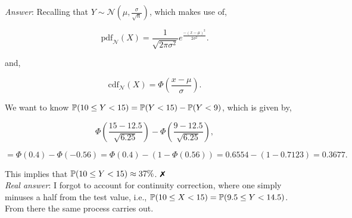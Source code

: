 \documentclass{article}
\begin{document}
            \textit{Answer}: Recalling that $Y\sim\mathcal{N}(\mu, \frac{\sigma}{\sqrt{n}})$, which makes use of,

            \[\text{pdf}_{\mathcal{N}}(X) = \frac{1}{\sqrt{2\pi\sigma^2}}e^{\frac{-(x - \mu)^2}{2\sigma^2}}.\]

            and,

            \[\text{cdf}_{\mathcal{N}}(X) = \Phi\left( \frac{x - \mu}{\sigma} \right).\]

            We want to know $\mathbb{P}(10 \leq Y < 15) = \mathbb{P}(Y < 15) - \mathbb{P}(Y < 9)$, which is given by,

            \[\Phi\left( \frac{15 - 12.5}{\sqrt{6.25}} \right) - \Phi\left( \frac{9 - 12.5}{\sqrt{6.25}} \right),\]

            \[= \Phi(0.4) - \Phi(-0.56) = \Phi(0.4) - (1 - \Phi(0.56)) = 0.6554 - (1 - 0.7123) = 0.3677.\]

            This implies that $\mathbb{P}(10 \leq Y < 15) \approx 37\%$. $\xmark$\\

            \textit{Real answer}: I forgot to account for continuity correction, where one simply minuses a half from the test value, i.e., $\mathbb{P}(10\leq X <15) = \mathbb{P}(9.5\leq Y < 14.5)$. From there the same process carries out.
\end{document}
